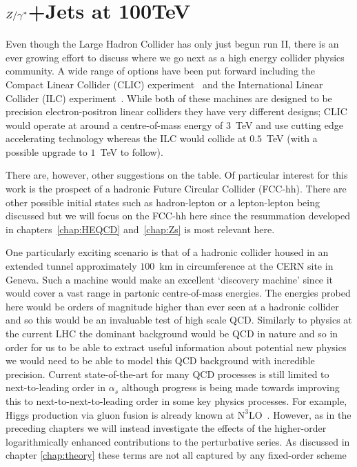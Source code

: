 
\chapter{$Z/\gamma^*$+Jets at 100TeV}
\label{chap:100TeV}

	Even though the Large Hadron Collider has only just begun run II, there is an ever growing effort to discuss
	where we go next as a high energy collider physics community.  A wide range of options have been put forward
	including the Compact Linear Collider (CLIC) experiment~\cite{Abramowicz:2013tzc} and the International
	Linear Collider (ILC) experiment~\cite{BrauJames:2007aa}.  While both of these machines are designed to be precision
	electron-positron linear colliders they have very different designs; CLIC would operate at around a
	centre-of-mass energy of $3$~TeV and use cutting edge accelerating technology whereas the ILC would collide
	at $0.5$~TeV (with a possible upgrade to $1$~TeV to follow).

	There are, however, other suggestions on the table.  Of particular interest for this work is the prospect
	of a hadronic Future Circular Collider (FCC-hh).  There are other possible initial states such as
	hadron-lepton or a lepton-lepton being discussed but we will focus on the FCC-hh here since the resummation
	developed in chapters~\ref{chap:HEQCD} and~\ref{chap:Zs} is most relevant here.

	One particularly exciting scenario is that of a \htev hadronic collider housed in an extended tunnel
	approximately $100$~km in circumference at the CERN site in Geneva.  Such a machine would make an
	excellent `discovery machine' since it would cover a vast range in partonic centre-of-mass energies.
	The energies probed here would be orders of magnitude higher than ever seen at a hadronic collider
	and so this would be an invaluable test of high scale QCD.  Similarly to physics at the current LHC
	the dominant background would be QCD in nature and so in order for us to be able to extract useful
	information about potential new physics we would need to be able to model this QCD background with
	incredible precision.  Current state-of-the-art for many QCD processes is still limited to next-to-leading
	order in $\alpha_s$ although progress is being made towards improving this to next-to-next-to-leading
	order in some key physics processes.  For example, Higgs production via gluon fusion is already known at
	$\text{N}^3$LO~\cite{Anastasiou:2015ema}. However, as in the preceding chapters we will instead
	investigate the effects of the higher-order logarithmically enhanced contributions to the perturbative
	series.  As discussed in chapter \ref{chap:theory} these terms are not all captured by any fixed-order scheme

